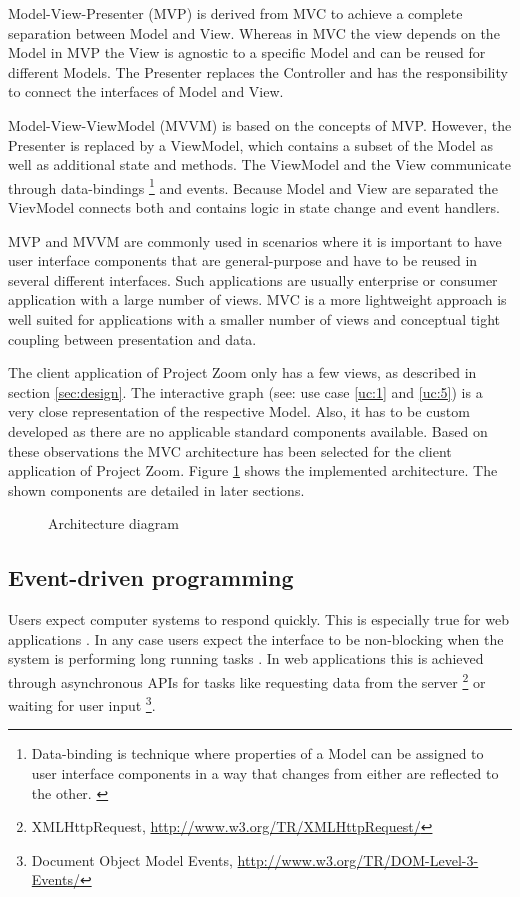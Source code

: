 Model-View-Presenter (MVP) is derived from MVC to achieve a complete separation between Model and View. Whereas in MVC the view depends on the Model in MVP the View is agnostic to a specific Model and can be reused for different Models. The Presenter replaces the Controller and has the responsibility to connect the interfaces of Model and View. 

Model-View-ViewModel (MVVM) is based on the concepts of MVP. However, the Presenter is replaced by a ViewModel, which contains a subset of the Model as well as additional state and methods. The ViewModel and the View communicate through data-bindings \footnote{Data-binding is technique where properties of a Model can be assigned to user interface components in a way that changes from either are reflected to the other. \cite{Bent_2004}} and events. Because Model and View are separated the VievModel connects both and contains logic in state change and event handlers.

MVP and MVVM are commonly used in scenarios where it is important to have user interface components that are general-purpose and have to be reused in several different interfaces. Such applications are usually enterprise or consumer application with a large number of views. MVC is a more lightweight approach is well suited for applications with a smaller number of views and conceptual tight coupling between presentation and data. \cite{Osmani_2012}

The client application of Project Zoom only has a few views, as described in section \ref{sec:design}. The interactive graph (see: use case \ref{uc:1} and \ref{uc:5}) is a very close representation of the respective Model. Also, it has to be custom developed as there are no applicable standard components available. Based on these observations the MVC architecture has been selected for the client application of Project Zoom. Figure \ref{fig:arch} shows the implemented architecture. The shown components are detailed in later sections. 

\begin{figure}
\caption{Architecture diagram}
\label{fig:arch}
\end{figure}

\subsection{Event-driven programming}

Users expect computer systems to respond quickly. This is especially true for web applications \cite{Selvidge_1999}. In any case users expect the interface to be non-blocking when the system is performing long running tasks \cite{Nielsen_1990}.  In web applications this is achieved through asynchronous APIs for tasks like requesting data from the server \footnote{XMLHttpRequest, \url{http://www.w3.org/TR/XMLHttpRequest/}} or waiting for user input \footnote{Document Object Model Events, \url{http://www.w3.org/TR/DOM-Level-3-Events/}}.

